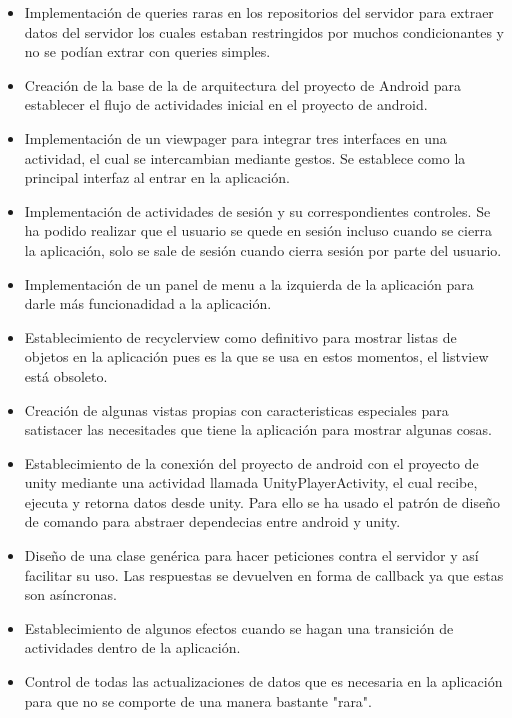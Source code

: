 \begin{itemize}
            \item Implementación de queries raras en los repositorios del servidor para extraer datos del servidor los cuales estaban restringidos 
            por muchos condicionantes y no se podían extrar con queries simples.
            \item Creación de la base de la de arquitectura del proyecto de Android para establecer el flujo de actividades inicial en el proyecto de android.
            \item Implementación de un viewpager para integrar tres interfaces en una actividad, el cual se intercambian mediante gestos. Se establece como la principal 
            interfaz al entrar en la aplicación.
            \item Implementación de actividades de sesión y su correspondientes controles. Se ha podido realizar que el usuario se quede en sesión incluso cuando se cierra 
            la aplicación, solo se sale de sesión cuando cierra sesión por parte del usuario.
            \item Implementación de un panel de menu a la izquierda de la aplicación para darle más funcionadidad a la aplicación.
            \item Establecimiento de recyclerview como definitivo para mostrar listas de objetos en la aplicación pues es la que se usa en estos momentos, el listview está obsoleto.
            \item Creación de algunas vistas propias con caracteristicas especiales para satistacer las necesitades 
            que tiene la aplicación para mostrar algunas cosas.
            \item Establecimiento de la conexión del proyecto de android con el proyecto de unity mediante una actividad llamada UnityPlayerActivity, el cual recibe, ejecuta y retorna datos
            desde unity. Para ello se ha usado el patrón de diseño de comando para abstraer dependecias entre android y unity.
            \item Diseño de una clase genérica para hacer peticiones contra el servidor y así facilitar su uso. Las respuestas se devuelven 
            en forma de callback ya que estas son asíncronas.
            \item Establecimiento de algunos efectos cuando se hagan una transición de actividades dentro de la aplicación.
            \item Control de todas las actualizaciones de datos que es necesaria en la aplicación para que no se comporte de una manera bastante "rara".

\end{itemize}

